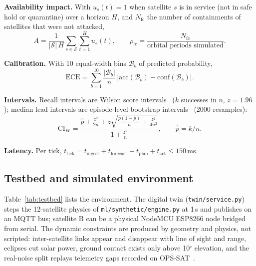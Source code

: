 \documentclass[10pt,a4paper]{article}
\newcommand{\file}[1]{\texttt{#1}}
\begin{document}
\textbf{Availability impact.} With $u_s(t)=1$ when satellite $s$ is in service (not in safe hold or
quarantine) over a horizon $H$, and $N_{\mathrm{fc}}$ the number of containments of satellites that were
not attacked,
\begin{equation}
A = \frac{1}{|\mathcal{S}|\,H}\sum_{s\in\mathcal{S}}\sum_{t=1}^{H} u_s(t),\qquad
\rho_{\mathrm{fc}} = \frac{N_{\mathrm{fc}}}{\text{orbital periods simulated}}.
\label{eq:avail}
\end{equation}

\textbf{Calibration.} With 10 equal-width bins $\mathcal{B}_b$ of predicted probability,
\begin{equation}
\mathrm{ECE} = \sum_{b=1}^{10}\frac{|\mathcal{B}_b|}{n}\,\big|\mathrm{acc}(\mathcal{B}_b)-\mathrm{conf}(\mathcal{B}_b)\big|.
\label{eq:ece}
\end{equation}

\textbf{Intervals.} Recall intervals are Wilson score intervals~\cite{wilson1927} ($k$ successes in
$n$, $z=1.96$); median lead intervals are episode-level bootstrap intervals~\cite{efron1979bootstrap}
(2000 resamples):
\begin{equation}
\mathrm{CI}_{\mathrm{W}} = \frac{\hat p+\frac{z^2}{2n}\pm z\sqrt{\frac{\hat p(1-\hat p)}{n}+\frac{z^2}{4n^2}}}{1+\frac{z^2}{n}},
\qquad \hat p=k/n.
\label{eq:wilson}
\end{equation}

\textbf{Latency.} Per tick, $t_{\mathrm{tick}}=t_{\mathrm{ingest}}+t_{\mathrm{forecast}}+t_{\mathrm{plan}}+t_{\mathrm{act}}\le 150$\,ms.

\subsection{Testbed and simulated environment}
Table~\ref{tab:testbed} lists the environment. The digital twin (\file{twin/service.py}) steps the
12-satellite physics of \file{ml/synthetic/engine.py} at 1\,s and publishes on an MQTT bus; satellite B
can be a physical NodeMCU ESP8266 node bridged from serial. The dynamic constraints are produced by
geometry and physics, not scripted: inter-satellite links appear and disappear with line of sight and
range, eclipses cut solar power, ground contact exists only above 10$^{\circ}$ elevation, and the
real-noise split replays telemetry gaps recorded on OPS-SAT~\cite{opssatad}.
\end{document}
